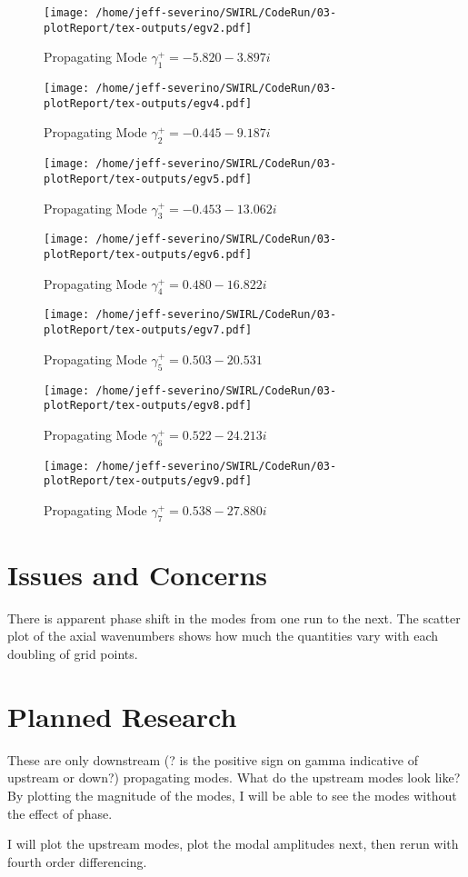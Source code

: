 \documentclass[a4paper]{article}
\begin{document}
 \begin{figure}
     \centering
     \texttt{[image: /home/jeff-severino/SWIRL/CodeRun/03-plotReport/tex-outputs/egv2.pdf]}
     \caption{Propagating Mode $\gamma^+_1 = -5.820-3.897i$}
 \end{figure}


 \begin{figure}
     \centering
     \texttt{[image: /home/jeff-severino/SWIRL/CodeRun/03-plotReport/tex-outputs/egv4.pdf]}
     \caption{Propagating Mode $\gamma^+_2 = -0.445-9.187i$}
 \end{figure}


 \begin{figure}
     \centering
     \texttt{[image: /home/jeff-severino/SWIRL/CodeRun/03-plotReport/tex-outputs/egv5.pdf]}
     \caption{Propagating Mode $\gamma^+_3 = -0.453-13.062i$}
 \end{figure}


 \begin{figure}
     \centering
     \texttt{[image: /home/jeff-severino/SWIRL/CodeRun/03-plotReport/tex-outputs/egv6.pdf]}
     \caption{Propagating Mode $\gamma^+_4 = 0.480 - 16.822i$}
 \end{figure}


 \begin{figure}
     \centering
     \texttt{[image: /home/jeff-severino/SWIRL/CodeRun/03-plotReport/tex-outputs/egv7.pdf]}
     \caption{Propagating Mode $\gamma^+_5 = 0.503 - 20.531$}
 \end{figure}


 \begin{figure}
     \centering
     \texttt{[image: /home/jeff-severino/SWIRL/CodeRun/03-plotReport/tex-outputs/egv8.pdf]}
     \caption{Propagating Mode $\gamma^+_6 = 0.522 - 24.213i$}
 \end{figure}

 \begin{figure}
     \centering
     \texttt{[image: /home/jeff-severino/SWIRL/CodeRun/03-plotReport/tex-outputs/egv9.pdf]}
     \caption{Propagating Mode $\gamma^+_7 = 0.538 - 27.880i$}
 \end{figure}
\section{Issues and Concerns}
There is apparent phase shift in the modes from one run to the next. The scatter
plot of the axial wavenumbers shows how much the quantities vary with each
doubling of grid points.  

\section{Planned Research}
These are only downstream (? is the positive sign on gamma indicative of upstream or down?)
propagating modes. What do the upstream modes look like? By plotting the magnitude
of the modes, I will be able to see the modes without the effect of phase. 

I will plot the upstream modes, plot the modal amplitudes next, then 
rerun with fourth order differencing.
\end{document}
